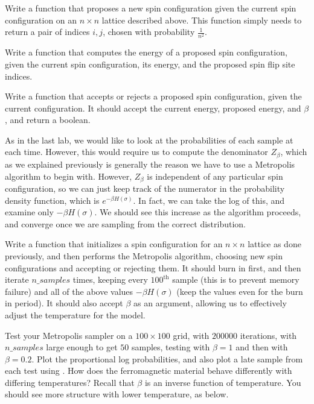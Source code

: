 \begin{problem}
Write a function that proposes a new spin configuration given the current spin configuration on an $n \times n$ lattice described above. This function simply needs to return a pair of indices $i,j$, chosen with probability $\frac{1}{n^{2}}$.
\end{problem}

\begin{problem}
Write a function that computes the energy of a proposed spin configuration, given the current spin configuration, its energy, and the proposed spin flip site indices.
\end{problem}

\begin{problem}
Write a function that accepts or rejects a proposed spin configuration, given the current configuration. It should accept the current energy, proposed energy, and $\beta$, and return a boolean.
\end{problem}

As in the last lab, we would like to look at the probabilities of each sample at each time. However, this would require us to compute the denominator $Z_{\beta}$, which as we explained previously is generally the reason we have to use a Metropolis algorithm to begin with. However, $Z_{\beta}$ is independent of any particular spin configuration, so we can just keep track of the numerator in the probability density function, which is $e^{-\beta H(\sigma)}$. In fact, we can take the log of this, and examine only $-\beta H(\sigma)$. We should see this increase as the algorithm proceeds, and converge once we are sampling from the correct distribution.

\begin{problem}
Write a function that initializes a spin configuration for an $n \times n$ lattice as done previously, and then performs the Metropolis algorithm, choosing new spin configurations and accepting or rejecting them. It should burn in first, and then iterate $n\_samples$ times, keeping every $100^{\text{th}}$ sample (this is to prevent memory failure) and all of the above values $-\beta H(\sigma)$ (keep the values even for the burn in period). It should also accept $\beta$ as an argument, allowing us to effectively adjust the temperature for the model. 
\end{problem}

\begin{problem}
Test your Metropolis sampler on a $100 \times 100$ grid, with $200000$ iterations, with $n\_samples$ large enough to get $50$ samples, testing with $\beta = 1$ and then with $\beta = 0.2$. Plot the proportional log probabilities, and also plot a late sample from each test using . How does the ferromagnetic material behave differently with differing temperatures? Recall that $\beta$ is an inverse function of temperature. You should see more structure with lower temperature, as below.
\end{problem}

